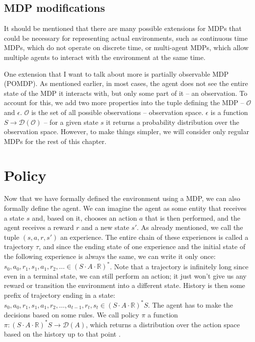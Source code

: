 \documentclass[
  digital,     %
  oneside,     %
  nosansbold,  %
  nocolorbold, %
  lof,         %
  lot,         %
]{fithesis4}
\begin{document}
\subsection{MDP modifications}
It should be mentioned that there are many possible extensions for MDPs that could be necessary for representing actual environments, such as continuous time MDPs, which do not operate on discrete time, or multi-agent MDPs, which allow multiple agents to interact with the environment at the same time. \cite[p. 59]{GDRL}

One extension that I want to talk about more is partially observable MDP (POMDP). As mentioned earlier, in most cases, the agent does not see the entire state of the MDP it interacts with, but only some part of it -- an observation. To account for this, we add two more properties into the tuple defining the MDP -- $\mathcal{O}$ and $\epsilon$. $\mathcal{O}$ is the set of all possible observations -- observation space. $\epsilon$ is a function $S \to \mathcal{D}(\mathcal{O})$ -- for a given state $s$ it returns a probability distribution over the observation space. However, to make things simpler, we will consider only regular MDPs for the rest of this chapter.

\section{Policy}
Now that we have formally defined the environment using a MDP, we can also formally define the agent. We can imagine the agent as some entity that receives a state $s$ and, based on it, chooses an action $a$ that is then performed, and the agent receives a reward $r$ and a new state $s'$. As already mentioned, we call the tuple $(s, a, r, s')$ an experience. The entire chain of these experiences is called a trajectory $\tau$, and since the ending state of one experience and the initial state of the following experience is always the same, we can write it only once: $s_0,a_0,r_1,s_1,a_1,r_2,\dotsc \in (S\cdot A \cdot \mathbb{R})^{*}$. Note that a trajectory is infinitely long since even in a terminal state, we can still perform an action; it just won't give us any reward or transition the environment into a different state. History is then some prefix of trajectory ending in a state: $s_0,a_0,r_1,s_1,a_1,r_2,\dotsc, a_{t-1},r_t,s_t\in (S\cdot A \cdot \mathbb{R})^{*}S$. The agent has to make the decisions based on some rules. We call policy $\pi$ a function $\pi\colon (S\cdot A \cdot \mathbb{R})^{*}S \to \mathcal{D}(A)$, which returns a distribution over the action space based on the history up to that point \cite[p. 19]{PA230}.
\end{document}
